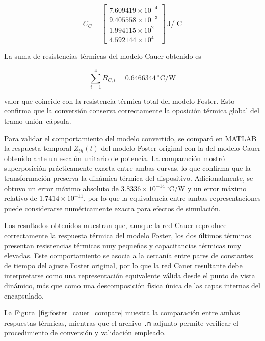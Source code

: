 \documentclass[journal]{IEEEtran}
\begin{document}
\begin{equation}
C_C=
\left[
\begin{array}{c}
7.609419\times10^{-4}\\
9.405558\times10^{-3}\\
1.994115\times10^{2}\\
4.592144\times10^{4}
\end{array}
\right]
\ \mathrm{J/^\circ C}
\label{eq:cc_mosfet}
\end{equation}

La suma de resistencias térmicas del modelo Cauer obtenido es

\begin{equation}
\sum_{i=1}^{4} R_{C,i}=0.6466344\ ^\circ\mathrm{C/W}
\label{eq:sum_rc}
\end{equation}

valor que coincide con la resistencia térmica total del modelo Foster. Esto confirma que la conversión conserva correctamente la oposición térmica global del tramo unión--cápsula.

Para validar el comportamiento del modelo convertido, se comparó en MATLAB la respuesta temporal $Z_{th}(t)$ del modelo Foster original con la del modelo Cauer obtenido ante un escalón unitario de potencia. La comparación mostró superposición prácticamente exacta entre ambas curvas, lo que confirma que la transformación preserva la dinámica térmica del dispositivo. Adicionalmente, se obtuvo un error máximo absoluto de $3.8336\times10^{-14}\ ^\circ$C/W y un error máximo relativo de $1.7414\times10^{-11}$, por lo que la equivalencia entre ambas representaciones puede considerarse numéricamente exacta para efectos de simulación.

Los resultados obtenidos muestran que, aunque la red Cauer reproduce correctamente la respuesta térmica del modelo Foster, los dos últimos términos presentan resistencias térmicas muy pequeñas y capacitancias térmicas muy elevadas. Este comportamiento se asocia a la cercanía entre pares de constantes de tiempo del ajuste Foster original, por lo que la red Cauer resultante debe interpretarse como una representación equivalente válida desde el punto de vista dinámico, más que como una descomposición física única de las capas internas del encapsulado.

La Figura~\ref{fig:foster_cauer_compare} muestra la comparación entre ambas respuestas térmicas, mientras que el archivo \texttt{.m} adjunto permite verificar el procedimiento de conversión y validación empleado.
\end{document}
